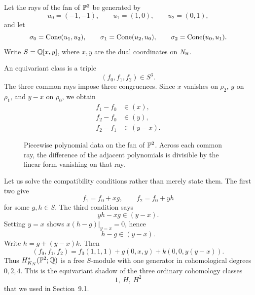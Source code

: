 Let the rays of the fan of \(\mathbb{P}^2\) be generated by
\[
u_0=(-1,-1),
\qquad
u_1=(1,0),
\qquad
u_2=(0,1),
\]
and let
\[
\sigma_0=\operatorname{Cone}(u_1,u_2),
\qquad
\sigma_1=\operatorname{Cone}(u_2,u_0),
\qquad
\sigma_2=\operatorname{Cone}(u_0,u_1).
\]
Write \(S=\mathbb{Q}[x,y]\), where \(x,y\) are the dual coordinates on
\(N_{\mathbb{R}}\).

An equivariant class is a triple
\[
(f_0,f_1,f_2)\in S^3.
\]
The three common rays impose three congruences. Since \(x\) vanishes on
\(\rho_2\), \(y\) on \(\rho_1\), and \(y-x\) on \(\rho_0\), we obtain
\[
\boxed{
\begin{aligned}
f_1-f_0&\in(x),\\
f_2-f_0&\in(y),\\
f_2-f_1&\in(y-x).
\end{aligned}}
\]

\begin{figure}[htbp]
\centering
{}
\caption{Piecewise polynomial data on the fan of \(\mathbb{P}^2\). Across
each common ray, the difference of the adjacent polynomials is
divisible by the linear form vanishing on that ray.}
\label{fig:p2-piecewise-polynomial}
\end{figure}

Let us solve the compatibility conditions rather than merely state
them. The first two give
\[
f_1=f_0+xg,
\qquad
f_2=f_0+yh
\]
for some \(g,h\in S\). The third condition says
\[
yh-xg\in(y-x).
\]
Setting \(y=x\) shows \(x(h-g)|_{y=x}=0\), hence
\[
h-g\in(y-x).
\]
Write \(h=g+(y-x)k\). Then
\[
\boxed{
(f_0,f_1,f_2)
=
f_0(1,1,1)
+g(0,x,y)
+k(0,0,y(y-x)).
}
\]
Thus \(H_{K_N}^*(\mathbb{P}^2;\mathbb{Q})\) is a free \(S\)-module with one generator
in cohomological degrees \(0,2,4\). This is the equivariant shadow of
the three ordinary cohomology classes
\[
1,\ H,\ H^2
\]
that we used in Section~9.1.

